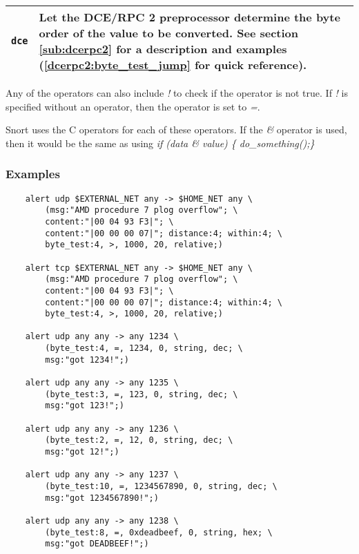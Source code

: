 \documentclass[english]{report}
\newenvironment{note}{
\samepage
    \vspace{10pt}{\textsf{
        {\hspace{7pt}\Huge{$\triangle$\hspace{-12.5pt}{\Large{$^!$}}}}\hspace{5pt}
        {\Large{NOTE}}
    }
    }
   \begin{center}
    \par\vspace{-17pt}

    \begin{lrbox}{\savepar}
    \begin{minipage}[r]{6in}
}
{
    \end{minipage}
    \end{lrbox}
    \fbox{
        \usebox{
            \savepar
	}
    }
    \par\vskip10pt
    \end{center}
}
\newenvironment{note}{
        \begin{rawhtml}
        <p><table border="1"><tr><td><b>
        Note:&nbsp;&nbsp;</b>
        \end{rawhtml}
}{
        \begin{rawhtml}
        </b></td></tr></table></p>
        \end{rawhtml}
}
\begin{document}
\begin{tabular}{| l | p{4.5in} |}
\hline
\texttt{dce} &

Let the DCE/RPC 2 preprocessor determine the byte order of the value to be
converted.  See section \ref{sub:dcerpc2} for a description and examples
(\ref{dcerpc2:byte_test_jump} for quick reference).\\

\hline
\end{tabular}

Any of the operators can also include \emph{!} to check if the operator is not
true.  If \emph{!} is specified without an operator, then the operator is set
to \emph{=}.

\begin{note}

Snort uses the C operators for each of these operators.  If the \emph{\&}
operator is used, then it would be the same as using \emph{if (data \& value)
\{ do\_something();\} }

\end{note}

\subsubsection{Examples}

\begin{verbatim}
    alert udp $EXTERNAL_NET any -> $HOME_NET any \
        (msg:"AMD procedure 7 plog overflow"; \
        content:"|00 04 93 F3|"; \
        content:"|00 00 00 07|"; distance:4; within:4; \
        byte_test:4, >, 1000, 20, relative;)
    
    alert tcp $EXTERNAL_NET any -> $HOME_NET any \
        (msg:"AMD procedure 7 plog overflow"; \
        content:"|00 04 93 F3|"; \
        content:"|00 00 00 07|"; distance:4; within:4; \
        byte_test:4, >, 1000, 20, relative;)
    
    alert udp any any -> any 1234 \
        (byte_test:4, =, 1234, 0, string, dec; \
        msg:"got 1234!";)
    
    alert udp any any -> any 1235 \
        (byte_test:3, =, 123, 0, string, dec; \
        msg:"got 123!";)
    
    alert udp any any -> any 1236 \
        (byte_test:2, =, 12, 0, string, dec; \
        msg:"got 12!";)
    
    alert udp any any -> any 1237 \
        (byte_test:10, =, 1234567890, 0, string, dec; \
        msg:"got 1234567890!";)
    
    alert udp any any -> any 1238 \
        (byte_test:8, =, 0xdeadbeef, 0, string, hex; \
        msg:"got DEADBEEF!";)
\end{verbatim}
\end{document}
